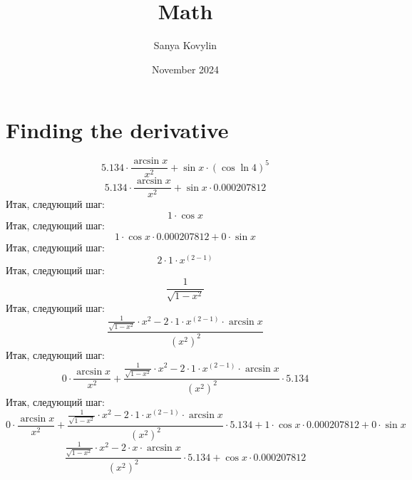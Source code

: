 
\title{Math}\author{Sanya Kovylin}
\date{November 2024}



\maketitle

\section{Finding the derivative}
\begin{equation} 
5.134\cdot \frac{\arcsin{x}}{x^{2}}+ \sin{x}\cdot (\cos{\ln{4}})^{5}
\end{equation} 
\begin{equation} 
5.134\cdot \frac{\arcsin{x}}{x^{2}}+ \sin{x}\cdot 0.000207812
\end{equation} 
Итак, следующий шаг: 
\begin{equation} 
1\cdot \cos{x}
\end{equation} 
Итак, следующий шаг: 
\begin{equation} 
1\cdot \cos{x}\cdot 0.000207812+ 0\cdot \sin{x}
\end{equation} 
Итак, следующий шаг: 
\begin{equation} 
2\cdot 1\cdot x^{(2- 1)}
\end{equation} 
Итак, следующий шаг: 
\begin{equation} 
\frac{1}{\sqrt{1- x^{2}}}
\end{equation} 
Итак, следующий шаг: 
\begin{equation} 
\frac{\frac{1}{\sqrt{1- x^{2}}}\cdot x^{2}- 2\cdot 1\cdot x^{(2- 1)}\cdot \arcsin{x}}{(x^{2})^{2}}
\end{equation} 
Итак, следующий шаг: 
\begin{equation} 
0\cdot \frac{\arcsin{x}}{x^{2}}+ \frac{\frac{1}{\sqrt{1- x^{2}}}\cdot x^{2}- 2\cdot 1\cdot x^{(2- 1)}\cdot \arcsin{x}}{(x^{2})^{2}}\cdot 5.134
\end{equation} 
Итак, следующий шаг: 
\begin{equation} 
0\cdot \frac{\arcsin{x}}{x^{2}}+ \frac{\frac{1}{\sqrt{1- x^{2}}}\cdot x^{2}- 2\cdot 1\cdot x^{(2- 1)}\cdot \arcsin{x}}{(x^{2})^{2}}\cdot 5.134+ 1\cdot \cos{x}\cdot 0.000207812+ 0\cdot \sin{x}
\end{equation} 
\begin{equation} 
\frac{\frac{1}{\sqrt{1- x^{2}}}\cdot x^{2}- 2\cdot x\cdot \arcsin{x}}{(x^{2})^{2}}\cdot 5.134+ \cos{x}\cdot 0.000207812
\end{equation} 
